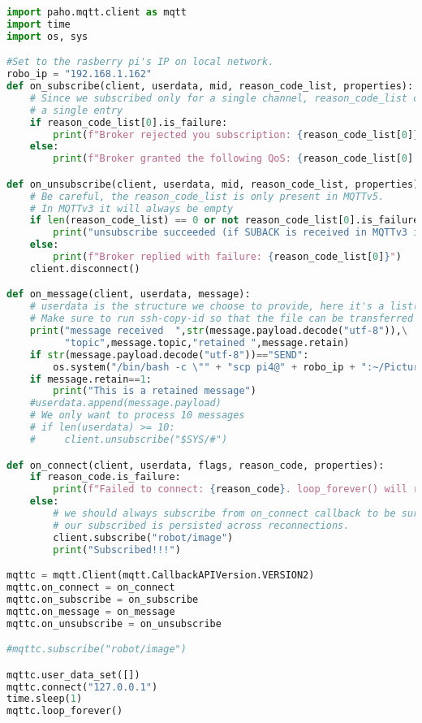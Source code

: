 \documentclass[12pt,a4paper]{article}
\begin{document}
\begin{lstlisting}[language=Python, caption=Command Unit Code]
import paho.mqtt.client as mqtt
import time
import os, sys

#Set to the rasberry pi's IP on local network.
robo_ip = "192.168.1.162"
def on_subscribe(client, userdata, mid, reason_code_list, properties):
    # Since we subscribed only for a single channel, reason_code_list contains
    # a single entry
    if reason_code_list[0].is_failure:
        print(f"Broker rejected you subscription: {reason_code_list[0]}")
    else:
        print(f"Broker granted the following QoS: {reason_code_list[0].value}")

def on_unsubscribe(client, userdata, mid, reason_code_list, properties):
    # Be careful, the reason_code_list is only present in MQTTv5.
    # In MQTTv3 it will always be empty
    if len(reason_code_list) == 0 or not reason_code_list[0].is_failure:
        print("unsubscribe succeeded (if SUBACK is received in MQTTv3 it success)")
    else:
        print(f"Broker replied with failure: {reason_code_list[0]}")
    client.disconnect()

def on_message(client, userdata, message):
    # userdata is the structure we choose to provide, here it's a list()
    # Make sure to run ssh-copy-id so that the file can be transferred without a password
    print("message received  ",str(message.payload.decode("utf-8")),\
          "topic",message.topic,"retained ",message.retain)
    if str(message.payload.decode("utf-8"))=="SEND":
        os.system("/bin/bash -c \"" + "scp pi4@" + robo_ip + ":~/Picture.jpg ./" + "\"")
    if message.retain==1:
        print("This is a retained message")
    #userdata.append(message.payload)
    # We only want to process 10 messages
    # if len(userdata) >= 10:
    #     client.unsubscribe("$SYS/#")

def on_connect(client, userdata, flags, reason_code, properties):
    if reason_code.is_failure:
        print(f"Failed to connect: {reason_code}. loop_forever() will retry connection")
    else:
        # we should always subscribe from on_connect callback to be sure
        # our subscribed is persisted across reconnections.
        client.subscribe("robot/image")
        print("Subscribed!!!")

mqttc = mqtt.Client(mqtt.CallbackAPIVersion.VERSION2)
mqttc.on_connect = on_connect
mqttc.on_subscribe = on_subscribe
mqttc.on_message = on_message
mqttc.on_unsubscribe = on_unsubscribe

#mqttc.subscribe("robot/image")

mqttc.user_data_set([])
mqttc.connect("127.0.0.1")
time.sleep(1)
mqttc.loop_forever()

\end{lstlisting}
\end{document}
